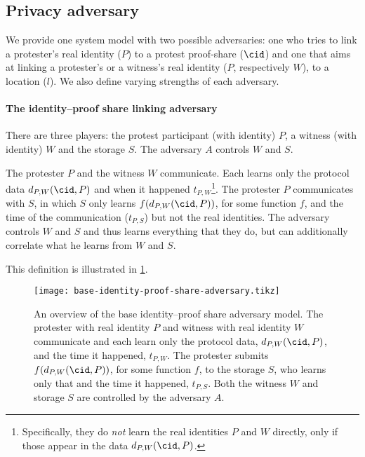 \subsection{Privacy adversary}%
\label{adversary-model-different-levels}

We provide one system model with two possible adversaries: one who tries to link a protester's real identity (\(P\)) to a protest proof-share (\(\cid\)) and one 
that aims at linking a protester's or a witness's real identity (\(P\), respectively \(W\)), to a location (\(l\)).
We also define varying strengths of each adversary.

\paragraph{The identity--proof share linking adversary}

There are three players: the protest participant (with identity) \(P\), a witness (with identity) \(W\) and the storage \(S\).
The adversary \(A\) controls \(W\) and \(S\).

\begin{definition}%
  \label{base-identity-proof-share-adversary}
  The protester \(P\) and the witness \(W\) communicate.
  Each learns only the protocol data \(d_{P,W}(\cid, P)\) and when it happened 
  \(t_{P,W}\)\footnote{%
    Specifically, they do \emph{not} learn the real identities \(P\) and \(W\) 
    directly, only if those appear in the data \(d_{P,W}(\cid, P)\).
  }.
  The protester \(P\) communicates with \(S\), in which \(S\) only learns 
  \(f(d_{P,W}(\cid, P))\), for some function \(f\), and the time of the 
  communication (\(t_{P,S}\)) but not the real identities.
  The adversary controls \(W\) and \(S\) and thus learns everything that they 
  do, but can additionally correlate what he learns from \(W\) and \(S\).
\end{definition}

This definition is illustrated in \cref{fig:identity-proof-share-adversary}.

\begin{figure}
  \centering
  \texttt{[image: base-identity-proof-share-adversary.tikz]}
  \caption{\label{fig:identity-proof-share-adversary}%
    An overview of the base identity--proof share adversary model.
    The protester with real identity \(P\) and witness with real identity \(W\) 
    communicate and each learn only the protocol data, \(d_{P,W}(\cid, P)\), 
    and the time it happened, \(t_{P,W}\).
    The protester submits \(f(d_{P,W}(\cid, P))\), for some function \(f\), to 
    the storage \(S\), who learns only that and the time it happened, 
    \(t_{P,S}\).
    Both the witness \(W\) and storage \(S\) are controlled by the adversary 
    \(A\).
  }
\end{figure}

